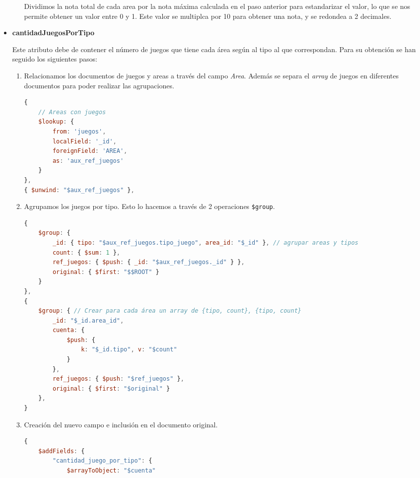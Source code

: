 \documentclass[]{article}
\begin{document}
\begin{itemize}
\begin{enumerate}
        Dividimos la nota total de cada area por la nota máxima calculada en el paso anterior para estandarizar el valor, lo que se nos permite obtener un valor entre 0 y 1. Este valor se multiplca por 10 para obtener una nota, y se redondea a 2 decimales.

    \end{enumerate}

    \item \textbf{cantidadJuegosPorTipo}
    
    Este atributo debe de contener el número de juegos que tiene cada área según al tipo al que correspondan. Para su obtención se han seguido los siguientes pasos: 
    \begin{enumerate}
        \item Relacionamos los documentos de juegos y areas a través del campo \textit{Area}. Además se separa el \textit{array} de juegos en diferentes documentos para poder realizar las agrupaciones.
\begin{lstlisting}[caption=Relación de juegos y áreas, language=JavaScript]
{
    // Areas con juegos
    $lookup: {
        from: 'juegos',
        localField: '_id',
        foreignField: 'AREA',
        as: 'aux_ref_juegos'
    }
},
{ $unwind: "$aux_ref_juegos" }, 

\end{lstlisting}
        \item Agrupamos los juegos por tipo. Esto lo hacemos a través de 2 operaciones \texttt{\$group}.
\begin{lstlisting}[caption=Agrupacion de juegos por tipo, language=JavaScript]
{
    $group: {
        _id: { tipo: "$aux_ref_juegos.tipo_juego", area_id: "$_id" }, // agrupar areas y tipos
        count: { $sum: 1 },
        ref_juegos: { $push: { _id: "$aux_ref_juegos._id" } },
        original: { $first: "$$ROOT" }
    }
},
{
    $group: { // Crear para cada área un array de {tipo, count}, {tipo, count}
        _id: "$_id.area_id",
        cuenta: {
            $push: {
                k: "$_id.tipo", v: "$count"
            }
        },
        ref_juegos: { $push: "$ref_juegos" },
        original: { $first: "$original" }
    },
}
\end{lstlisting}
        \item Creación del nuevo campo e inclusión en el documento original.

\begin{lstlisting}[caption=Creación de nuevo campo en el documento original, language=JavaScript]
{
    $addFields: {
        "cantidad_juego_por_tipo": {
            $arrayToObject: "$cuenta"


\end{lstlisting}
\end{enumerate}
\end{itemize}
\end{document}
